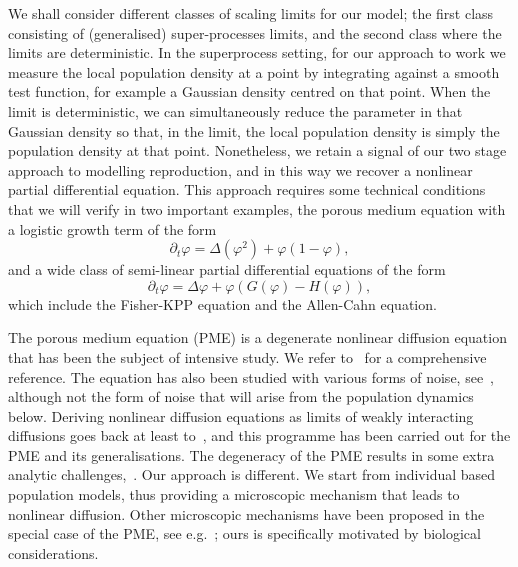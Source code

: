 \documentclass[12pt]{article}
\begin{document}
We shall consider different classes of scaling limits for our model; the first class consisting of
(generalised) super-processes limits, and the second class where the limits are deterministic. In the
superprocess setting, for our approach to work we measure the local population
density at a point by integrating against a smooth test function, for example 
a Gaussian density centred on that point.  
When the limit is deterministic,
we can simultaneously reduce the parameter in that Gaussian density so that,
in the limit, the local population density is simply the population density 
at that point. Nonetheless, we retain a signal of our two stage approach
to modelling reproduction, and  
in this way we recover a nonlinear partial differential equation. 
This approach requires some technical conditions that we will verify in two important examples,
the porous medium equation with a logistic growth term of the form 
$$\partial_t \varphi = \Delta (\varphi^2)+\varphi(1-\varphi),$$
and a wide class of semi-linear partial differential equations of the form 
$$\partial_t \varphi = \Delta\varphi+ \varphi \left(G(\varphi)-H(\varphi)\right),$$
which include the Fisher-KPP equation and the Allen-Cahn equation.

The porous medium equation (PME)
is a degenerate nonlinear diffusion equation that
has been the subject of intensive study. We refer to~\cite{vazquez:2007} for 
a comprehensive reference. The equation has also been studied with various
forms of noise, see~\cite{barbu/daprato/roeckner:2016}, although not the 
form of noise that will arise from the population dynamics below. 
Deriving nonlinear diffusion equations as limits of weakly interacting 
diffusions goes back at least to~\cite{mckean:1967}, and this 
programme has been
carried out for the PME and its generalisations. 
The degeneracy of the PME
results in some extra analytic
challenges,~\cite{jourdain:2000}.
Our approach is different.
We start from individual
based population models, thus providing a microscopic mechanism that leads to 
nonlinear diffusion.
Other microscopic mechanisms have been proposed in the special case of the
PME, see 
e.g.~\cite{feng/iscoe/seppalainen:1997, oelschlaeger:1990}; ours
is specifically motivated by biological considerations.
\end{document}
